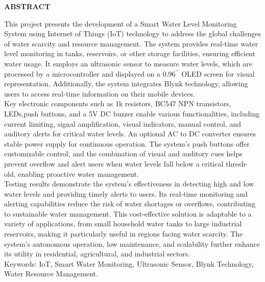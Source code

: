 \vspace*{0.6cm}
\begin{center}
    \fontsize{16}{19}\selectfont
    \textbf{ABSTRACT}\\[0.5cm]
\end{center}

\vspace{1cm}
{
\fontsize{12}{14}\selectfont
\noindent
This project presents the development of a Smart Water Level Monitoring System using Internet of Things (IoT) technology to address the global challenges of water scarcity and resource management. The system provides real-time water level monitoring in tanks, reservoirs, or other storage facilities, ensuring efficient water usage. It employs an ultrasonic sensor to measure water levels, which are processed by a microcontroller and displayed on a 0.96$^{\prime\prime}$ OLED screen for visual representation. Additionally, the system integrates Blynk technology, allowing users to access real-time information on their mobile devices.\\

\noindent
Key electronic components such as 1k resistors, BC547 NPN transistors, LEDs,push buttons, and a 5V DC buzzer enable various functionalities, including current limiting, signal amplification, visual indicators, manual control, and auditory alerts for critical water levels. An optional AC to DC converter ensures stable power supply for continuous operation. The system's push buttons offer customizable control, and the combination of visual and auditory cues helps prevent overflow and alert users when water levels fall below a critical thresh- old, enabling proactive water management. \\

\noindent
Testing results demonstrate the system's effectiveness in detecting high and low water levels and providing timely alerts to users. Its real-time monitoring and alerting capabilities reduce the risk of water shortages or overflows, contributing to sustainable water management. This cost-effective solution is adaptable to a variety of applications, from small household water tanks to large industrial reservoirs, making it particularly useful in regions facing water scarcity. The system's autonomous operation, low maintenance, and scalability further enhance its utility in residential, agricultural, and industrial sectors.\\

\vspace{3cm}
\noindent
Keywords: IoT, Smart Water Monitoring, Ultrasonic Sensor, Blynk Technology, Water Resource Management.

} 
